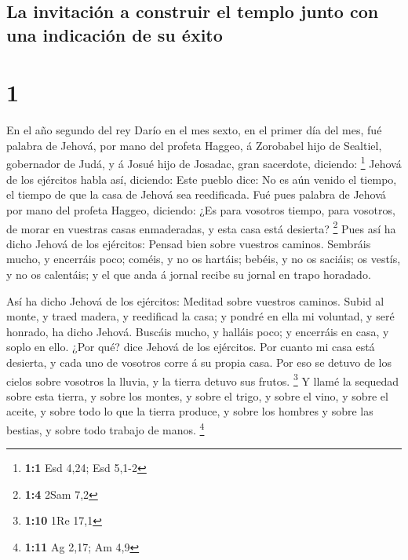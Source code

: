\hypertarget{la-invitaciuxf3n-a-construir-el-templo-junto-con-una-indicaciuxf3n-de-su-uxe9xito}{%
\subsection{La invitación a construir el templo junto con una indicación
de su
éxito}\label{la-invitaciuxf3n-a-construir-el-templo-junto-con-una-indicaciuxf3n-de-su-uxe9xito}}

\hypertarget{section}{%
\section{1}\label{section}}

 En el año segundo del rey Darío en el mes sexto, en el
primer día del mes, fué palabra de Jehová, por mano del profeta Haggeo,
á Zorobabel hijo de Sealtiel, gobernador de Judá, y á Josué hijo de
Josadac, gran sacerdote, diciendo: \footnote{\textbf{1:1} Esd 4,24; Esd
  5,1-2}  Jehová de los ejércitos habla así, diciendo: Este
pueblo dice: No es aún venido el tiempo, el tiempo de que la casa de
Jehová sea reedificada.  Fué pues palabra de Jehová por mano
del profeta Haggeo, diciendo:  ¿Es para vosotros tiempo,
para vosotros, de morar en vuestras casas enmaderadas, y esta casa está
desierta? \footnote{\textbf{1:4} 2Sam 7,2}  Pues así ha
dicho Jehová de los ejércitos: Pensad bien sobre vuestros caminos.
 Sembráis mucho, y encerráis poco; coméis, y no os hartáis;
bebéis, y no os saciáis; os vestís, y no os calentáis; y el que anda á
jornal recibe su jornal en trapo horadado.

 Así ha dicho Jehová de los ejércitos: Meditad sobre
vuestros caminos.  Subid al monte, y traed madera, y
reedificad la casa; y pondré en ella mi voluntad, y seré honrado, ha
dicho Jehová.  Buscáis mucho, y halláis poco; y encerráis en
casa, y soplo en ello. ¿Por qué? dice Jehová de los ejércitos. Por
cuanto mi casa está desierta, y cada uno de vosotros corre á su propia
casa.  Por eso se detuvo de los cielos sobre vosotros la
lluvia, y la tierra detuvo sus frutos. \footnote{\textbf{1:10} 1Re 17,1}
 Y llamé la sequedad sobre esta tierra, y sobre los montes,
y sobre el trigo, y sobre el vino, y sobre el aceite, y sobre todo lo
que la tierra produce, y sobre los hombres y sobre las bestias, y sobre
todo trabajo de manos. \footnote{\textbf{1:11} Ag 2,17; Am 4,9}

